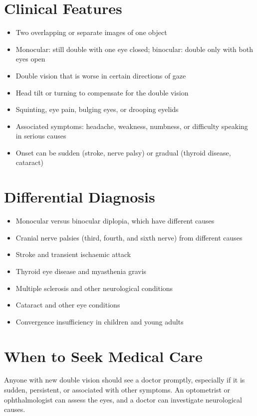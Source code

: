 \section*{Clinical Features}
\begin{itemize}
    \item Two overlapping or separate images of one object
    \item Monocular: still double with one eye closed; binocular: double only with both eyes open
    \item Double vision that is worse in certain directions of gaze
    \item Head tilt or turning to compensate for the double vision
    \item Squinting, eye pain, bulging eyes, or drooping eyelids
    \item Associated symptoms: headache, weakness, numbness, or difficulty speaking in serious causes
    \item Onset can be sudden (stroke, nerve palsy) or gradual (thyroid disease, cataract)
\end{itemize}

\section*{Differential Diagnosis}
\begin{itemize}
    \item Monocular versus binocular diplopia, which have different causes
    \item Cranial nerve palsies (third, fourth, and sixth nerve) from different causes
    \item Stroke and transient ischaemic attack
    \item Thyroid eye disease and myasthenia gravis
    \item Multiple sclerosis and other neurological conditions
    \item Cataract and other eye conditions
    \item Convergence insufficiency in children and young adults
\end{itemize}

\section*{When to Seek Medical Care}
Anyone with new double vision should see a doctor promptly, especially if it is sudden, persistent, or associated with other symptoms. An optometrist or ophthalmologist can assess the eyes, and a doctor can investigate neurological causes.

